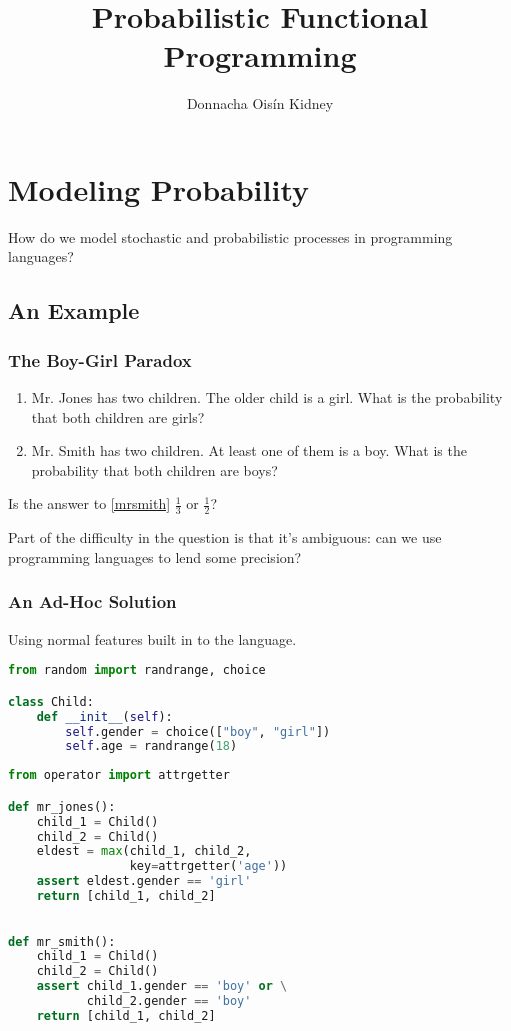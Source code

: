 \documentclass[usenames,dvipsnames]{beamer}
\title{Probabilistic Functional Programming}
\author{Donnacha Oisín Kidney}
\begin{document}
\frame{\titlepage}
\frame{\tableofcontents}
\section{Modeling Probability}
\begin{frame}
  How do we model stochastic and probabilistic processes in programming
  languages?
\end{frame}
\subsection{An Example}
\begin{frame}
  \frametitle{The Boy-Girl Paradox}
  \begin{enumerate}
    \item Mr. Jones has two children. The older child is a girl. What is the
      probability that both children are girls?
    \item \label{mrsmith} Mr. Smith has two children. At least one of them is a
      boy. What is the probability that both children are boys?
  \end{enumerate}
  \pause
  Is the answer to \ref{mrsmith} $\frac{1}{3}$ or $\frac{1}{2}$?
  \pause

  Part of the difficulty in the question is that it's ambiguous: can we use
  programming languages to lend some precision?
\end{frame}
\begin{frame}
  \frametitle{An Ad-Hoc Solution}
  Using normal features built in to the language.
  \begin{lstlisting}[language=Python]
from random import randrange, choice

class Child:
    def __init__(self):
        self.gender = choice(["boy", "girl"])
        self.age = randrange(18)
  \end{lstlisting}
  \begin{lstlisting}[language=Python]
from operator import attrgetter

def mr_jones():
    child_1 = Child()
    child_2 = Child()
    eldest = max(child_1, child_2,
                 key=attrgetter('age'))
    assert eldest.gender == 'girl'
    return [child_1, child_2]
  \end{lstlisting}
  \begin{lstlisting}[language=Python]

def mr_smith():
    child_1 = Child()
    child_2 = Child()
    assert child_1.gender == 'boy' or \
           child_2.gender == 'boy'
    return [child_1, child_2]
  \end{lstlisting}
\end{frame}
\end{document}
